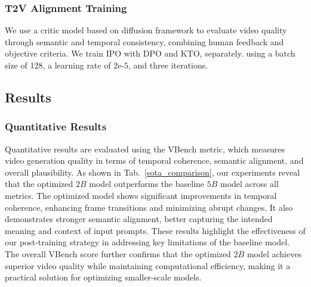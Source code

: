 \subsubsection{T2V Alignment Training}

We use a critic model based on diffusion framework to evaluate video quality through semantic and temporal consistency, combining human feedback and objective criteria. We train IPO with DPO and KTO, separately.
using a batch size of 128, a learning rate of $2\text{e-}5$, and three iterations. %



\subsection{Results}

\subsubsection{Quantitative Results}


Quantitative results are evaluated using the VBench metric, which measures video generation quality in terms of temporal coherence, semantic alignment, and overall plausibility. As shown in Tab.~\ref{sota_comparison}, our experiments reveal that the optimized $2B$ model outperforms the baseline $5B$ model across all metrics. The optimized model shows significant improvements in temporal coherence, enhancing frame transitions and minimizing abrupt changes. It also demonstrates stronger semantic alignment, better capturing the intended meaning and context of input prompts. These results highlight the effectiveness of our post-training strategy in addressing key limitations of the baseline model. The overall VBench score further confirms that the optimized $2B$ model achieves superior video quality while maintaining computational efficiency, making it a practical solution for optimizing smaller-scale models.

